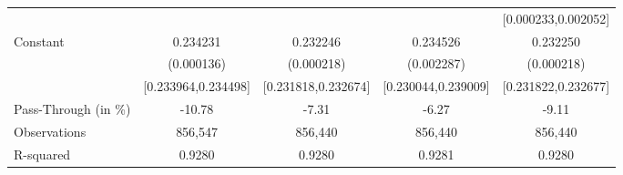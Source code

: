 {\begin{tabular}{l*{4}{c}}
                    &                     &                     &                     &[0.000233,0.002052]         \\
Constant            &    0.234231\sym{***}&    0.232246\sym{***}&    0.234526\sym{***}&    0.232250\sym{***}\\
                    &  (0.000136)         &  (0.000218)         &  (0.002287)         &  (0.000218)         \\
                    &[0.233964,0.234498]         &[0.231818,0.232674]         &[0.230044,0.239009]         &[0.231822,0.232677]         \\
\midrule
Pass-Through (in \%)&      -10.78         &       -7.31         &       -6.27         &       -9.11         \\
Observations        &     856,547         &     856,440         &     856,440         &     856,440         \\
R-squared           &      0.9280         &      0.9280         &      0.9281         &      0.9280         \\
\bottomrule
\end{tabular}
}

